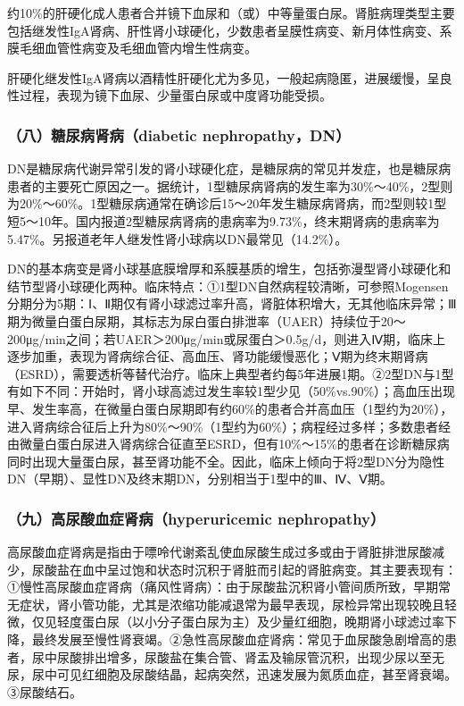 约10\%的肝硬化成人患者合并镜下血尿和（或）中等量蛋白尿。肾脏病理类型主要包括继发性IgA肾病、肝性肾小球硬化，少数患者呈膜性病变、新月体性病变、系膜毛细血管性病变及毛细血管内增生性病变。

肝硬化继发性IgA肾病以酒精性肝硬化尤为多见，一般起病隐匿，进展缓慢，呈良性过程，表现为镜下血尿、少量蛋白尿或中度肾功能受损。

\subsubsection{（八）糖尿病肾病（diabetic nephropathy，DN）}

DN是糖尿病代谢异常引发的肾小球硬化症，是糖尿病的常见并发症，也是糖尿病患者的主要死亡原因之一。据统计，1型糖尿病肾病的发生率为30\%～40\%，2型则为20\%～60\%。1型糖尿病通常在确诊后15～20年发生糖尿病肾病，而2型则较1型短5～10年。国内报道2型糖尿病肾病的患病率为9.73\%，终末期肾病的患病率为5.47\%。另报道老年人继发性肾小球病以DN最常见（14.2\%）。

DN的基本病变是肾小球基底膜增厚和系膜基质的增生，包括弥漫型肾小球硬化和结节型肾小球硬化两种。临床特点：①1型DN自然病程较清晰，可参照Mogensen分期分为5期：Ⅰ、Ⅱ期仅有肾小球滤过率升高，肾脏体积增大，无其他临床异常；Ⅲ期为微量白蛋白尿期，其标志为尿白蛋白排泄率（UAER）持续位于20～200μg/min之间；若UAER＞200μg/min或尿蛋白＞0.5g/d，则进入Ⅳ期，临床上逐步加重，表现为肾病综合征、高血压、肾功能缓慢恶化；Ⅴ期为终末期肾病（ESRD），需要透析等替代治疗。临床上典型者约每5年进展1期。②2型DN与1型有如下不同：开始时，肾小球高滤过发生率较1型少见（50\%vs.90\%）；高血压出现早、发生率高，在微量白蛋白尿期即有约60\%的患者合并高血压（1型约为20\%），进入肾病综合征后上升为80\%～90\%（1型约为60\%）；病程经过多样；多数患者经由微量白蛋白尿进入肾病综合征直至ESRD，但有10\%～15\%的患者在诊断糖尿病同时出现大量蛋白尿，甚至肾功能不全。因此，临床上倾向于将2型DN分为隐性DN（早期）、显性DN及终末期DN，分别相当于1型中的Ⅲ、Ⅳ、Ⅴ期。

\subsubsection{（九）高尿酸血症肾病（hyperuricemic nephropathy）}

高尿酸血症肾病是指由于嘌呤代谢紊乱使血尿酸生成过多或由于肾脏排泄尿酸减少，尿酸盐在血中呈过饱和状态时沉积于肾脏而引起的肾脏病变。其主要表现有：①慢性高尿酸血症肾病（痛风性肾病）：由于尿酸盐沉积肾小管间质所致，早期常无症状，肾小管功能，尤其是浓缩功能减退常为最早表现，尿检异常出现较晚且轻微，仅见轻度蛋白尿（以小分子蛋白尿为主）及少量红细胞，晚期肾小球滤过率下降，最终发展至慢性肾衰竭。②急性高尿酸血症肾病：常见于血尿酸急剧增高的患者，尿中尿酸排出增多，尿酸盐在集合管、肾盂及输尿管沉积，出现少尿以至无尿，尿中可见红细胞及尿酸结晶，起病突然，迅速发展为氮质血症，甚至肾衰竭。③尿酸结石。

